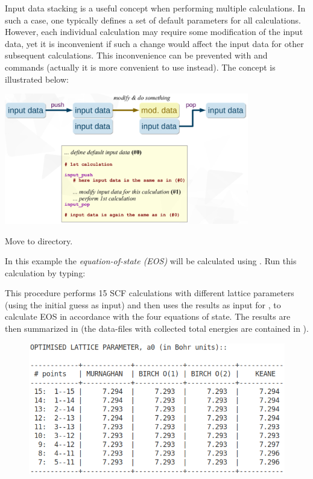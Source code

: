 \documentclass[landscape]{foils}
\begin{document}
\rightheader{}

{\small Input data stacking is a useful concept when performing
  multiple calculations. In such a case, one typically defines a set
  of default parameters for all calculations. However, each individual
  calculation may require some modification of the input data, yet it
  is inconvenient if such a change would affect the input data for
  other subsequent calculations.
  This inconvenience can be prevented with  and 
  commands (actually it is more convenient to use  instead). The concept is illustrated below:}

\centerline{\includegraphics[width=0.8\textwidth]{figs/i-data-stacking.png}}


Move to  directory.

In this example the
{\em equation-of-state (EOS)} will be calculated using
. Run this calculation by typing:\\

This procedure performs 15 SCF calculations with different lattice
parameters (using the initial guess as input) and then uses the
results as input for , to calculate EOS in accordance with
the four equations of state. The results are then summarized in
 {\small (the  data-files with
  collected total energies are contained in
  )}.

\begin{figure}
\centering
\includegraphics[width=14.0cm]{figs/LATTICE_PARAMETERS.png}
\end{figure}
\end{document}
